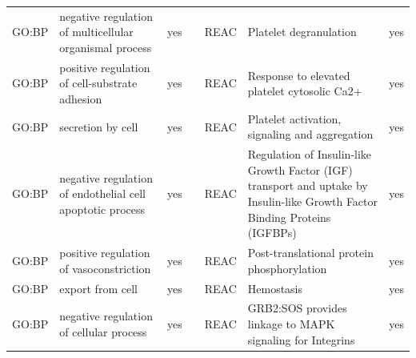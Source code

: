 \begin{longtable}{@{}lp{5cm}lllp{5cm}l@{}}
GO:BP           & negative regulation of multicellular organismal process                                                                            & yes              &           & REAC            & Platelet degranulation                                                                                                                                                 & yes              \\
GO:BP           & positive regulation of cell-substrate adhesion                                                                                     & yes              &           & REAC            & Response to elevated platelet cytosolic Ca2+                                                                                                                           & yes              \\
GO:BP           & secretion by cell                                                                                                                  & yes              &           & REAC            & Platelet activation, signaling and aggregation                                                                                                                         & yes              \\
GO:BP           & negative regulation of endothelial cell apoptotic process                                                                          & yes              &           & REAC            & Regulation of Insulin-like Growth Factor (IGF) transport and uptake by Insulin-like Growth Factor Binding Proteins (IGFBPs) & yes              \\
GO:BP           & positive regulation of vasoconstriction                                                                                            & yes              &           & REAC            & Post-translational protein phosphorylation                                                                                                                             & yes              \\
GO:BP           & export from cell                                                                                                                   & yes              &           & REAC            & Hemostasis                                                                                                                                                             & yes              \\
GO:BP           & negative regulation of cellular process                                                                                            & yes              &           & REAC            & GRB2:SOS provides linkage to MAPK signaling for Integrins                                                                                                              & yes              \\

\end{longtable}
